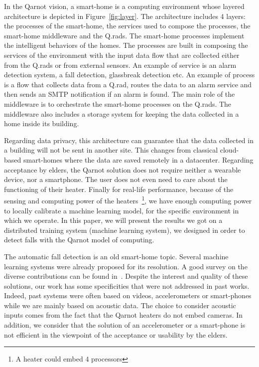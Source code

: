 \documentclass[10pt, conference, compsocconf]{IEEEtran}
\begin{document}
In the Qarnot vision, a smart-home is a computing environment whose layered architecture is depicted in Figure~\ref{fig:layer}. 
The architecture includes 4 layers: the processes of the smart-home, the services used to compose the processes, 
the smart-home middleware and the Q.rads.
The smart-home processes implement the intelligent behaviors of the homes. The processes are built in composing the services of 
the environment with the input data flow that are collected either from the Q.rads or from external sensors. An 
example of service is an alarm detection system, a fall detection, glassbreak detection etc. An example 
of process is a flow that collects data from a Q.rad, routes the data to an alarm service 
and then sends an SMTP notification if an alarm is found. The main role of the middleware is to orchestrate 
the smart-home processes on the Q.rads. The middleware also includes a storage system for keeping the data collected 
in a home inside its building. 

Regarding data privacy, this architecture can guarantee that the data collected in a building will not be sent 
in another site. This changes from classical cloud-based smart-homes where the data are saved remotely in a datacenter. 
Regarding acceptance by elders, the Qarnot solution does not require neither a wearable device, nor a smartphone. 
The user does not even need to care about the functioning of their heater. Finally for real-life performance, because of the sensing and 
computing power of the heaters~\footnote{ A heater could embed $4$ processors}, we have enough computing power to locally 
calibrate a machine learning model, for the specific environment in which we operate.
In this paper, we will present the results we got on a distributed training system (machine learning system), 
we designed in order to detect falls with the Qarnot model of computing. 

The automatic fall detection is an old smart-home topic. Several machine learning systems were already 
proposed for its resolution. A good survey on the diverse contributions can be found in~\cite{Igual2013,Mubashir:2013:SFD:2397722.2397898}. 
Despite the interest and quality of these solutions, our work has some specificities that were not addressed in past 
works. Indeed, past systems were often based on videos, accelerometers or smart-phones while we are mainly based on 
acoustic data. The choice to consider acoustic inputs comes from the fact that the Qarnot heaters do not embed cameras. In addition, 
we consider that the solution of an accelerometer or a smart-phone is not efficient in the viewpoint of the acceptance or 
usability by the elders. 
\end{document}
